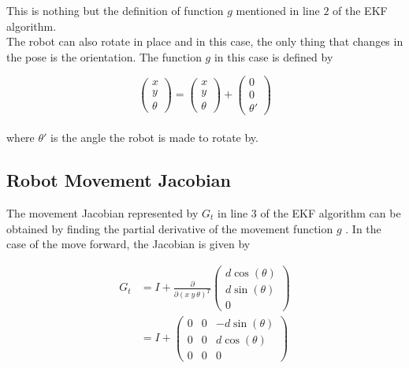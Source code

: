 \documentclass[conference]{IEEEtran}
\begin{document}
This is nothing but the definition of function $g$ mentioned in line $2$ of the EKF algorithm.\\

The robot can also rotate in place and in this case, the only thing that changes in the pose is the orientation. The function $g$ in this case is defined by 

\begin{equation}\label{RobotInPlaceRotation}
\begin{pmatrix}
	x\\
	y\\
	\theta
\end{pmatrix} = 
\begin{pmatrix}
	x\\
	y\\
	\theta
\end{pmatrix}
+
\begin{pmatrix}
	0\\
	0\\
	\theta'
\end{pmatrix}
\end{equation}\\


where $\theta'$ is the angle the robot is made to rotate by.

\subsection{Robot Movement Jacobian}
\label{sssec:num3} 

The movement Jacobian represented by $G_t$ in line $3$ of the EKF algorithm can be obtained by finding the partial derivative of the movement function $g$ \cite{thrun}. In the case of the move forward, the Jacobian is given by

\begin{equation}\label{MovementJacobian1}
\begin{aligned}
G_t &= I + \frac{\partial}{\partial(x~y~\theta)^T}
\begin{pmatrix}
	d\cos(\theta)\\
	d\sin(\theta)\\
	0
\end{pmatrix}\\
&= I + 
\begin{pmatrix}
	0 &0 &-d\sin(\theta)\\
	0 &0 &d\cos(\theta)\\
	0 &0 &0
\end{pmatrix}
\end{aligned}
\end{equation}
\end{document}
